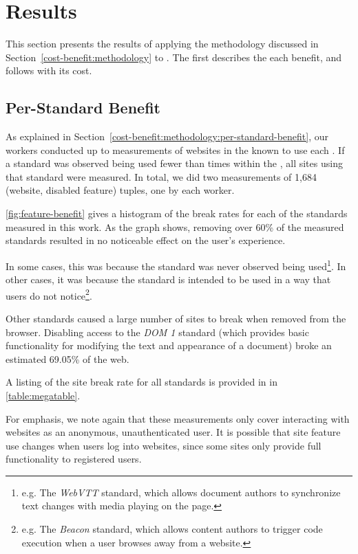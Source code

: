 \section{Results}
\label{cost-benefit:results}

This section presents the results of applying the methodology discussed in
Section~\ref{cost-benefit:methodology} to \FFWithVersion.  The first
describes the each \WAS benefit, and follows with its cost.




\subsection{Per-Standard Benefit}
\label{cost-benefit:results:results-benefit}


As explained in Section~\ref{cost-benefit:methodology:per-standard-benefit},
our workers conducted up to \NumSitesPerStandard measurements of websites in
the \ATK known to use each \WAS. If a standard was observed being used
fewer than \NumSitesPerStandard times within the \ATK, all sites using that
standard were measured. In total, we did two measurements of 1,684 (website,
disabled feature) tuples, one by each worker.

\ref{fig:feature-benefit} gives a histogram of the break rates for each of
the \NumStandards standards measured in this work.  As the graph shows, removing
over 60\% of the measured standards resulted in no noticeable effect on the
user's experience.

In some cases, this was because the standard was never observed being
used\footnote{e.g. The \textit{WebVTT} standard, which allows document
authors to synchronize text changes with media playing on the page.}.
In other cases, it was because the standard is intended to be used in a way
that users do not notice\footnote{e.g. The \textit{Beacon} standard, which allows content
authors to trigger code execution when a user browses away from a website.}.

Other standards caused a large number of sites to break when removed from the
browser.  Disabling access to the \textit{DOM 1} standard (which provides basic
functionality for modifying the text and appearance of a document) broke an
estimated 69.05\% of the web.

A listing of the site break rate for all \NumStandards standards is provided in
in \ref{table:megatable}.

For emphasis, we note again that these measurements only cover interacting with
websites as an anonymous, unauthenticated user. It is possible that site
feature use changes when users log into websites, since some sites only provide
full functionality to registered users.


